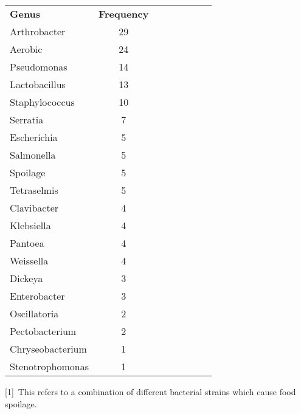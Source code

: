 \documentclass[11pt]{article}
\begin{document}
\begin{table}[htbp]
\begin{tabularx}{\linewidth}{l*{7}{c}}
					\midrule
		\textbf{Genus} & \textbf{Frequency} \\
		Arthrobacter & 29 \\
		Aerobic & 24 \\
		Pseudomonas & 14 \\
		Lactobacillus & 13 \\
		Staphylococcus & 10 \\
		Serratia & 7 \\
		Escherichia & 5 \\
		Salmonella & 5 \\
		Spoilage & 5 \\
		Tetraselmis & 5 \\
		Clavibacter & 4 \\
		Klebsiella & 4 \\
		Pantoea & 4 \\
		Weissella & 4 \\
		Dickeya & 3 \\
		Enterobacter & 3 \\
		Oscillatoria & 2 \\
		Pectobacterium & 2 \\
		Chryseobacterium & 1 \\
		Stenotrophomonas & 1 \\
		\bottomrule
	\end{tabularx}
		
		[1]\ This refers to a combination of different bacterial strains which cause food spoilage.
	\end{table}
	
\end{document}
